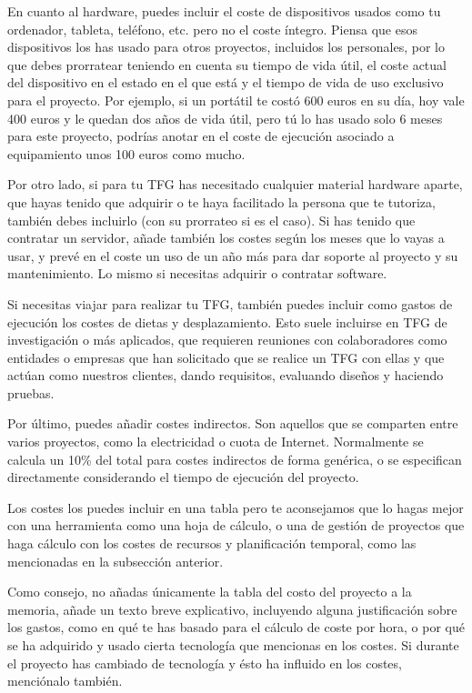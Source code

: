 En cuanto al hardware, puedes incluir el coste de dispositivos usados como tu ordenador, tableta, teléfono, etc. pero no el coste íntegro. Piensa que esos dispositivos los has usado para otros proyectos, incluidos los personales, por lo que debes prorratear teniendo en cuenta su tiempo de vida útil, el coste actual del dispositivo en el estado en el que está y el tiempo de vida de uso exclusivo para el proyecto. Por ejemplo, si un portátil te costó 600 euros en su día, hoy vale 400 euros y le quedan dos años de vida útil, pero tú lo has usado solo 6 meses para este proyecto, podrías anotar en el coste de ejecución asociado a equipamiento unos 100 euros como mucho.  

Por otro lado, si para tu TFG has necesitado cualquier material hardware aparte, que hayas tenido que adquirir o te haya facilitado la persona que te tutoriza, también debes incluirlo (con su prorrateo si es el caso). Si has tenido que contratar un servidor, añade también los costes según los meses que lo vayas a usar, y prevé en el coste un uso de un año más para dar soporte al proyecto y su mantenimiento. Lo mismo si necesitas adquirir o contratar software.

Si necesitas viajar para realizar tu TFG, también puedes incluir como gastos de ejecución los costes de dietas y desplazamiento. Esto suele incluirse en TFG de investigación o más aplicados, que requieren reuniones con colaboradores como entidades o empresas que han solicitado que se realice un TFG con ellas y que actúan como nuestros clientes, dando requisitos, evaluando diseños y haciendo pruebas. 

Por último, puedes añadir costes indirectos. Son aquellos que se comparten entre varios proyectos, como la electricidad o cuota de Internet. Normalmente se calcula un 10\% del total para costes indirectos de forma genérica, o se especifican directamente considerando el tiempo de ejecución del proyecto.

Los costes los puedes incluir en una tabla pero te aconsejamos que lo hagas mejor con una herramienta como una hoja de cálculo, o una de gestión de proyectos que haga cálculo con los costes de recursos y planificación temporal, como las mencionadas en la subsección anterior.

Como consejo, no añadas únicamente la tabla del costo del proyecto a la memoria, añade un texto breve explicativo, incluyendo alguna justificación sobre los gastos, como en qué te has basado para el cálculo de coste por hora, o por qué se ha adquirido y usado cierta tecnología que mencionas en los costes. Si durante el proyecto has cambiado de tecnología y ésto ha influido en los costes, menciónalo también.

